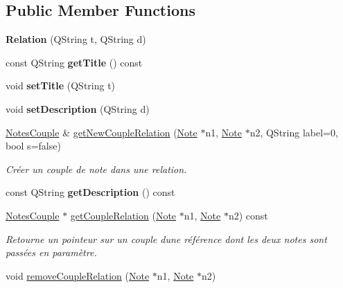 \subsection*{Public Member Functions}
\begin{DoxyCompactItemize}
\item 
\mbox{\label{class_relation_ac665710061b98c5e13acaf3d9c5f68f6}} 
{\bfseries Relation} (Q\+String t, Q\+String d)
\item 
\mbox{\label{class_relation_a9fa4906bc1024cce50cab4755c5bdecf}} 
const Q\+String {\bfseries get\+Title} () const
\item 
\mbox{\label{class_relation_a10e75a04dcb8f1a4661d1a316bc49f05}} 
void {\bfseries set\+Title} (Q\+String t)
\item 
\mbox{\label{class_relation_a5fd3dc676bd0e4994b5fa1897c3a3a93}} 
void {\bfseries set\+Description} (Q\+String d)
\item 
\hyperlink{class_notes_couple}{Notes\+Couple} \& \hyperlink{class_relation_a69211cc18aed20c1df97c4b73317a2e1}{get\+New\+Couple\+Relation} (\hyperlink{class_note}{Note} $\ast$n1, \hyperlink{class_note}{Note} $\ast$n2, Q\+String label=0, bool s=false)
\begin{DoxyCompactList}\small\item\em Créer un couple de note dans une relation. \end{DoxyCompactList}\item 
\mbox{\label{class_relation_a8bae20c027348b4e374c525f6ab1d840}} 
const Q\+String {\bfseries get\+Description} () const
\item 
\hyperlink{class_notes_couple}{Notes\+Couple} $\ast$ \hyperlink{class_relation_a086c39ecf396e3cfcb465fd9eea5a904}{get\+Couple\+Relation} (\hyperlink{class_note}{Note} $\ast$n1, \hyperlink{class_note}{Note} $\ast$n2) const
\begin{DoxyCompactList}\small\item\em Retourne un pointeur sur un couple d\textquotesingle{}une référence dont les deux notes sont passées en paramètre. \end{DoxyCompactList}\item 
void \hyperlink{class_relation_ab81e16d688dcb4703e8ab299fef80c10}{remove\+Couple\+Relation} (\hyperlink{class_note}{Note} $\ast$n1, \hyperlink{class_note}{Note} $\ast$n2)

\end{DoxyCompactItemize}
